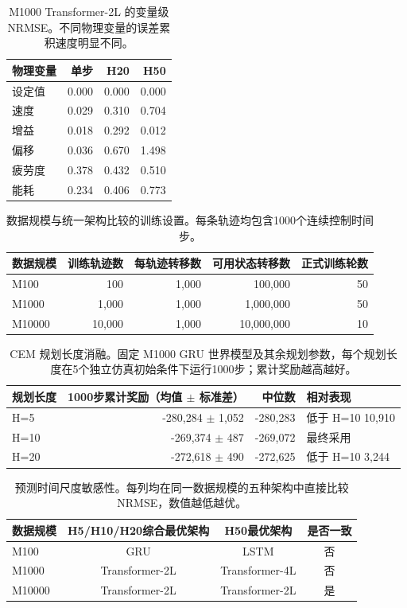 \begin{table}[H]
\centering
\caption{M1000 Transformer-2L 的变量级 NRMSE。不同物理变量的误差累积速度明显不同。}
\label{tab:per_variable}
\small
\begin{tabular}{lrrr}
\toprule
物理变量 & 单步 & H20 & H50 \\
\midrule
设定值 & 0.000 & 0.000 & 0.000 \\
速度 & 0.029 & 0.310 & 0.704 \\
增益 & 0.018 & 0.292 & 0.012 \\
偏移 & 0.036 & 0.670 & 1.498 \\
疲劳度 & 0.378 & 0.432 & 0.510 \\
能耗 & 0.234 & 0.406 & 0.773 \\
\bottomrule
\end{tabular}
\end{table}


\begin{table}[H]
\centering
\caption{数据规模与统一架构比较的训练设置。每条轨迹均包含1000个连续控制时间步。}
\label{tab:data_scales}
\small
\begin{tabular}{lrrrr}
\toprule
数据规模 & 训练轨迹数 & 每轨迹转移数 & 可用状态转移数 & 正式训练轮数 \\
\midrule
M100 & 100 & 1,000 & 100,000 & 50 \\
M1000 & 1,000 & 1,000 & 1,000,000 & 50 \\
M10000 & 10,000 & 1,000 & 10,000,000 & 10 \\
\bottomrule
\end{tabular}
\end{table}


\begin{table}[H]
\centering
\caption{CEM 规划长度消融。固定 M1000 GRU 世界模型及其余规划参数，每个规划长度在5个独立仿真初始条件下运行1000步；累计奖励越高越好。}
\label{tab:horizon_ablation}
\small
\begin{tabular}{lrrl}
\toprule
规划长度 & 1000步累计奖励（均值 $\pm$ 标准差） & 中位数 & 相对表现 \\
\midrule
H=5 & -280,284 $\pm$ 1,052 & -280,283 & 低于 H=10 10,910 \\
H=10 & -269,374 $\pm$ 487 & -269,072 & 最终采用 \\
H=20 & -272,618 $\pm$ 490 & -272,625 & 低于 H=10 3,244 \\
\bottomrule
\end{tabular}
\end{table}


\begin{table}[H]
\centering
\caption{预测时间尺度敏感性。每列均在同一数据规模的五种架构中直接比较 NRMSE，数值越低越优。}
\label{tab:horizon_sensitivity}
\small
\begin{tabular}{lccc}
\toprule
数据规模 & H5/H10/H20综合最优架构 & H50最优架构 & 是否一致 \\
\midrule
M100 & GRU & LSTM & 否 \\
M1000 & Transformer-2L & Transformer-4L & 否 \\
M10000 & Transformer-2L & Transformer-2L & 是 \\
\bottomrule
\end{tabular}
\end{table}


